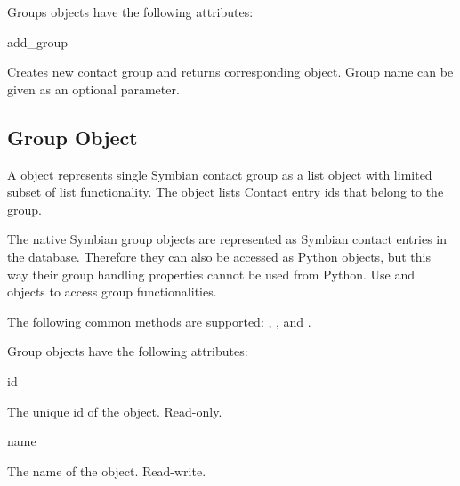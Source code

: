 \begin{classdesc*}{Groups}
 objects have the following attributes:

\begin{methoddesc}[Groups]{add_group}{}

Creates new contact group and returns corresponding  object.
Group name can be given as an optional parameter.

\end{methoddesc}

\end{classdesc*}



\subsection{Group Object}
\label{subsec:group}

A  object represents single Symbian contact group as a list object 
with limited subset of list functionality. The  object lists Contact
entry ids that belong to the group.

The native Symbian group objects are represented as Symbian contact entries in
the database. Therefore they can also be accessed as Python  objects,
 but this way their group handling properties cannot be used from Python. Use 
 and  objects to access group functionalities. 

The following common methods are supported: , ,
 and .

\begin{classdesc*}{Group}
 objects have the following attributes:

\begin{memberdesc}[Group]{id}

The unique id of the  object. Read-only.

\end{memberdesc}

\begin{memberdesc}[Group]{name}

The name of the  object. Read-write.

\end{memberdesc}

\end{classdesc*}

\newpage










